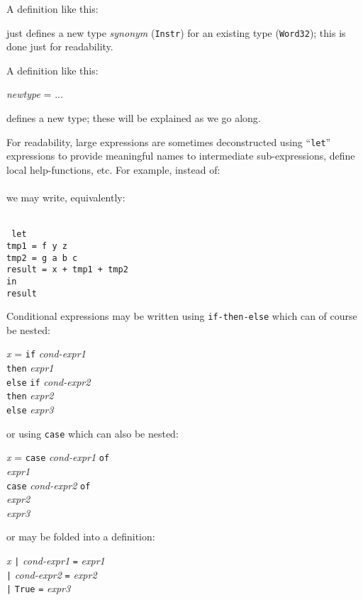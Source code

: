 \documentclass[11pt]{article}
\newcommand{\hmm}{\hspace*{2em}}
\newcommand{\hmmm}{\hspace*{3em}}
\newcommand{\hmmmm}{\hspace*{4em}}
\begin{document}
A definition like this:

\hmmm {\tt type Instr = Word32}

just defines a new type \emph{synonym} ({\tt Instr}) for an existing type ({\tt Word32});
this is done just for readability.

A definition like this:

\hmmm {\tt data} \emph{newtype} = ...

defines a new type; these will be explained as we go along.

For readability, large expressions are sometimes deconstructed using
``{\tt let}'' expressions to provide meaningful names to intermediate
sub-expressions, define local help-functions, etc. For example,
instead of: \\
\hmmmm{\tt x + f y z - g a b c} \\
we may write, equivalently: \\
\hmmmm \
\begin{minipage}[t]{4in}\tt
let \\
\hmm tmp1 = f y z \\
\hmm tmp2 = g a b c \\
\hmm result = x + tmp1 + tmp2 \\
in \\
\hmm result
\end{minipage}

Conditional expressions may be written using \verb|if-then-else| which can of course be nested:
\begin{tabbing}
\hmmm \= \emph{x} = \= {\tt if} \emph{cond-expr1} \\
      \>            \> {\tt then} \emph{expr1} \\
      \>            \> {\tt else} \= {\tt if} \emph{cond-expr2} \\
      \>            \>            \> {\tt then} \emph{expr2} \\
      \>            \>            \> {\tt else} \emph{expr3}
\end{tabbing}
or using \verb|case| which can also be nested:
\begin{tabbing}
\hmmm \= \emph{x} = \= {\tt case} \emph{cond-expr1} {\tt of}\\
      \>            \> \hmm {\tt True -> } \emph{expr1} \\
      \>            \> \hmm {\tt False ->} \= {\tt case} \emph{cond-expr2} {\tt of}\\
      \>            \>                     \> \hmm {\tt True ->} \emph{expr2} \\
      \>            \>                     \> \hmm {\tt False ->} \emph{expr3}
\end{tabbing}
or may be folded into a definition:
\begin{tabbing}
\hmmm \= \emph{x} \= {\tt |} \emph{cond-expr1} \= {\tt =} \emph{expr1} \\
      \>          \> {\tt |} \emph{cond-expr2} \> {\tt =} \emph{expr2} \\
      \>          \> {\tt |} {\tt True}        \> {\tt =} \emph{expr3}
\end{tabbing}
\end{document}
